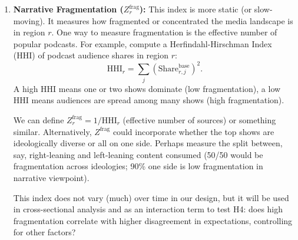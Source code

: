 \documentclass[12pt]{article}
\begin{document}
\begin{enumerate}
          $Z^{\text{dir}}$ will tell us whether a region is more exposed to, say, a conservative economic narrative (positive value) or a liberal narrative (negative value) at time $t$. This is important because the nature of expectation bias might depend on direction. For instance, one narrative might consistently predict higher inflation (e.g., those worried about government deficits might always warn of inflation), while another might downplay inflation. If our outcome of interest is inflation expectations, $Z^{\text{dir}}$ could explain whether a region expects higher or lower inflation bias.

          We will likely interact $Z^{\text{dir}}$ with the sign of forecast errors to test if, for example, Republican-leaning narratives cause over-prediction of growth when a Democrat is in office (just as a hypothetical pattern).

    \item \textbf{Narrative Fragmentation ($Z^{\text{frag}}_{r}$):} This index is more static (or slow-moving). It measures how fragmented or concentrated the media landscape is in region $r$. One way to measure fragmentation is the effective number of popular podcasts. For example, compute a Herfindahl-Hirschman Index (HHI) of podcast audience shares in region $r$:
          \[
              \text{HHI}_r = \sum_{j} (\text{Share}_{r,j}^{\text{base}})^2.
          \]
          A high HHI means one or two shows dominate (low fragmentation), a low HHI means audiences are spread among many shows (high fragmentation).

          We can define $Z^{\text{frag}}_r = 1/\text{HHI}_r$ (effective number of sources) or something similar. Alternatively, $Z^{\text{frag}}$ could incorporate whether the top shows are ideologically diverse or all on one side. Perhaps measure the split between, say, right-leaning and left-leaning content consumed (50/50 would be fragmentation across ideologies; 90\% one side is low fragmentation in narrative viewpoint).

          This index does not vary (much) over time in our design, but it will be used in cross-sectional analysis and as an interaction term to test H4: does high fragmentation correlate with higher disagreement in expectations, controlling for other factors?
\end{enumerate}
\end{document}
